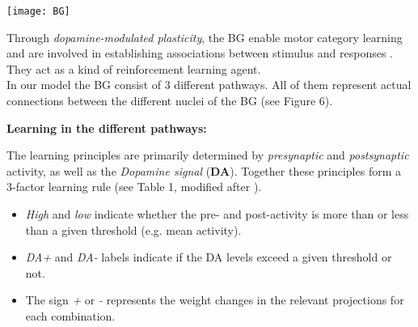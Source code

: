 \documentclass[portrait,final,a0paper,fontscale=0.33]{baposter}
\begin{document}
\begin{poster}
{\begin{adjustbox}{minipage=0.95\textwidth, margin=5pt, center}
\begin{minipage}[l]{0.45\textwidth}
			\vspace{15pt}
			\begin{flushright}
				\texttt{[image: BG]}
			\end{flushright}

			
			\vspace{25pt}
			\justifying
			
			Through \textit{dopamine-modulated plasticity}, the BG enable motor category learning \parencite{segerHowBasalGanglia2008a} and are involved in establishing associations between stimulus and responses \parencite{packardLearningMemoryFunctions2002a}. They act as a kind of reinforcement learning agent. \\
			In our model the BG consist of 3 different pathways. All of them represent actual connections between the different nuclei of the BG (see Figure 6).
			
			\vspace{5pt}
			
		\end{minipage}
		\hfill
		\begin{minipage}[r]{0.55\textwidth}
			\textbf{Learning in the different pathways:}\\
			\justifying
			
			The learning principles are primarily determined by \textit{presynaptic} and \textit{postsynaptic} activity, as well as the \textit{Dopamine signal} (\textbf{DA}). Together these principles form a 3-factor learning rule (see Table 1, modified after \cite{maithOptimalAttentionTuning2021c}).
			\vspace{1pt}
			\begin{itemize}
				\item \textit{High} and \textit{low} indicate whether the pre- and post-activity is more than or less than a given threshold (e.g. mean activity).
				\item \textit{DA+} and \textit{DA-} labels indicate if the DA levels exceed a given threshold or not.
				\item The sign \textit{+} or \textit{-} represents the weight changes in the relevant projections for each combination.
			\end{itemize}
			
			
			
		\end{minipage}
	\end{adjustbox}

}
\end{poster}
\end{document}
